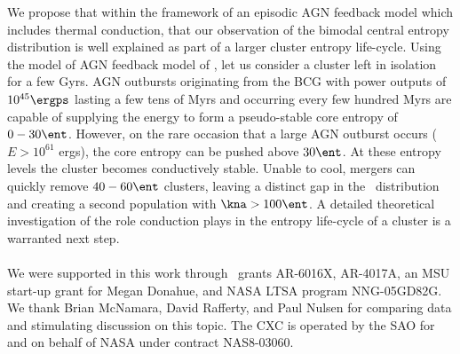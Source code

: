\documentclass{emulateapj}
\begin{document}
We propose that within the framework of an episodic AGN feedback model
which includes thermal conduction, that our observation of the bimodal
central entropy distribution is well explained as part of a larger
cluster entropy life-cycle. Using the model of AGN feedback model of
\cite{agnframework}, let us consider a cluster left in isolation for a
few Gyrs. AGN outbursts originating from the BCG with power outputs of
$10^{45} \ergps$ lasting a few tens of Myrs and occurring every few
hundred Myrs are capable of supplying the energy to form a
pseudo-stable core entropy of $0-30 \ent$. However, on the rare
occasion that a large AGN outburst occurs ($E > 10^{61}$ ergs), the
core entropy can be pushed above $30 \ent$. At these entropy levels
the cluster becomes conductively stable. Unable to cool, mergers can
quickly remove $40-60 \ent$ clusters, leaving a distinct gap in the
\kna\ distribution and creating a second population with $\kna > 100
\ent$. A detailed theoretical investigation of the role conduction
plays in the entropy life-cycle of a cluster is a warranted next step.
\\
\\
We were supported in this work through \Chandra\ grants AR-6016X,
AR-4017A, an MSU start-up grant for Megan Donahue, and NASA LTSA
program NNG-05GD82G. We thank Brian McNamara, David Rafferty, and Paul
Nulsen for comparing data and stimulating discussion on this topic.
The CXC is operated by the SAO for and on behalf of NASA under
contract NAS8-03060.



\end{document}
